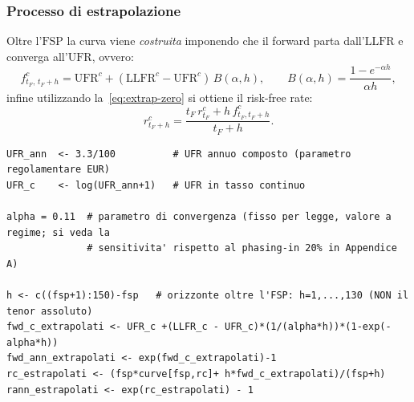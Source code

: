 \documentclass[11pt,a4paper]{article}
\theoremstyle{plain}
\theoremstyle{definition}
\theoremstyle{remark}
\newcommand{\UFR}{\mathrm{UFR}}
\newcommand{\LLFR}{\mathrm{LLFR}}
\newcommand{\FSP}{\mathrm{FSP}}
\begin{document}
\subsubsection{Processo di estrapolazione}
\label{sec:estrapolazione-calcolo}

Oltre l'$\FSP$ la curva viene  \emph{costruita} imponendo che il forward parta dall'$\LLFR$ e converga
all'$\UFR$, ovvero:
\[
  f^c_{t_F,\,t_F+h} = \UFR^c + (\LLFR^c - \UFR^c)\,B(\alpha,h),
  \qquad B(\alpha,h) = \frac{1-e^{-\alpha h}}{\alpha h},
\]
infine utilizzando la~\eqref{eq:extrap-zero} si ottiene il risk-free rate:
\[
  r^c_{t_F+h} = \frac{t_F\,r^c_{t_F} + h\,f^c_{t_F,t_F+h}}{t_F+h}.
\]

\begin{codebox}
\begin{Verbatim}[fontsize=\small]
UFR_ann  <- 3.3/100          # UFR annuo composto (parametro regolamentare EUR)
UFR_c    <- log(UFR_ann+1)   # UFR in tasso continuo

alpha = 0.11  # parametro di convergenza (fisso per legge, valore a regime; si veda la
              # sensitivita' rispetto al phasing-in 20% in Appendice A)

h <- c((fsp+1):150)-fsp   # orizzonte oltre l'FSP: h=1,...,130 (NON il tenor assoluto)
fwd_c_extrapolati <- UFR_c +(LLFR_c - UFR_c)*(1/(alpha*h))*(1-exp(-alpha*h))
fwd_ann_extrapolati <- exp(fwd_c_extrapolati)-1
rc_estrapolati <- (fsp*curve[fsp,rc]+ h*fwd_c_extrapolati)/(fsp+h)
rann_estrapolati <- exp(rc_estrapolati) - 1
\end{Verbatim}
\end{codebox}


\end{document}
